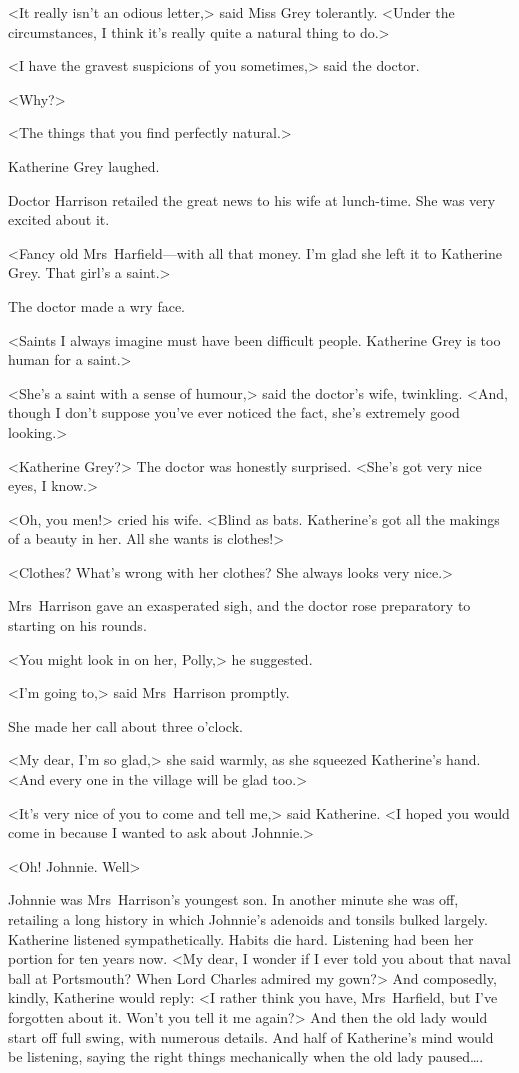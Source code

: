 <It really isn't an odious letter,> said Miss Grey tolerantly. <Under the circumstances, I think it's really quite a natural thing to do.>

<I have the gravest suspicions of you sometimes,> said the doctor.

<Why?>

<The things that you find perfectly natural.>

Katherine Grey laughed.

Doctor Harrison retailed the great news to his wife at lunch-time. She was very excited about it.

<Fancy old Mrs~Harfield—with all that money. I'm glad she left it to Katherine Grey. That girl's a saint.>

The doctor made a wry face.

<Saints I always imagine must have been difficult people. Katherine Grey is too human for a saint.>

<She's a saint with a sense of humour,> said the doctor's wife, twinkling. <And, though I don't suppose you've ever noticed the fact, she's extremely good looking.>

<Katherine Grey?> The doctor was honestly surprised. <She's got very nice eyes, I know.>

<Oh, you men!> cried his wife. <Blind as bats. Katherine's got all the makings of a beauty in her. All she wants is clothes!>

<Clothes? What's wrong with her clothes? She always looks very nice.>

Mrs~Harrison gave an exasperated sigh, and the doctor rose preparatory to starting on his rounds.

<You might look in on her, Polly,> he suggested.

<I'm going to,> said Mrs~Harrison promptly.

She made her call about three o'clock.

<My dear, I'm so glad,> she said warmly, as she squeezed Katherine's hand. <And every one in the village will be glad too.>

<It's very nice of you to come and tell me,> said Katherine. <I hoped you would come in because I wanted to ask about Johnnie.>

<Oh! Johnnie. Well\longdash>

Johnnie was Mrs~Harrison's youngest son. In another minute she was off, retailing a long history in which Johnnie's adenoids and tonsils bulked largely. Katherine listened sympathetically. Habits die hard. Listening had been her portion for ten years now. <My dear, I wonder if I ever told you about that naval ball at Portsmouth? When Lord Charles admired my gown?> And composedly, kindly, Katherine would reply: <I rather think you have, Mrs~Harfield, but I've forgotten about it. Won't you tell it me again?> And then the old lady would start off full swing, with numerous details. And half of Katherine's mind would be listening, saying the right things mechanically when the old lady paused\dots.

